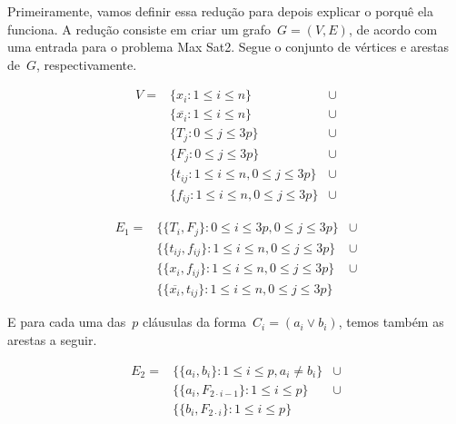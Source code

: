 		Primeiramente, vamos definir essa redução para depois
		explicar o porquê ela funciona.
		A redução consiste em criar um grafo~$G=(V,E)$, de 
		acordo com uma entrada para o problema Max Sat2.
		Segue o conjunto de vértices e arestas de~$G$, 
		respectivamente.
		
		\begin{align}
			V = &\{x_i: 1\le i\le n\} &\cup \nonumber\\
				&\{\overline{x_i}: 1\le i\le n\} &\cup\nonumber\\ 
				&\{T_j: 0\le j\le 3p\} &\cup \nonumber\\
				&\{F_j: 0\le j\le 3p\} &\cup \nonumber\\
				&\{t_{ij}: 1\le i\le n, 0\le j\le 3p\} 
					&\cup \nonumber\\
				&\{f_{ij}: 1\le i\le n, 0\le j\le 3p\} 
					&\cup \nonumber
		\end{align}

		\begin{align}
			E_1=&\{ \{T_i,F_j\}: 0\le i\le 3p, 0\le j\le 3p\} &\cup 
					\nonumber\\
				&\{\{t_{ij}, f_{ij}\}: 1\le i\le n, 
					0\le j\le 3p\} &\cup \nonumber \\
				&\{\{x_i, f_{ij}\}: 1\le i\le n, 
					0\le j\le 3p\} &\cup \nonumber \\
				&\{\{\overline{x_i}, t_{ij}\}: 1\le 
					i\le n, 0\le j\le 3p\} \nonumber
		\end{align}


		E para cada uma das~$p$ cláusulas da forma~$C_i=(a_i\lor b_i)$, 
		temos também as arestas a seguir.

		\begin{align}
			E_2=&\{ \{a_i,b_i\}: 1\le i\le p, a_i\ne b_i \} &\cup 
					\nonumber\\
				&\{\{a_i, F_{2\cdot i-1}\}: 1\le i\le p\} &\cup \nonumber \\
				&\{\{b_i, F_{2\cdot i}\}: 1\le i\le p\} \nonumber
		\end{align}

